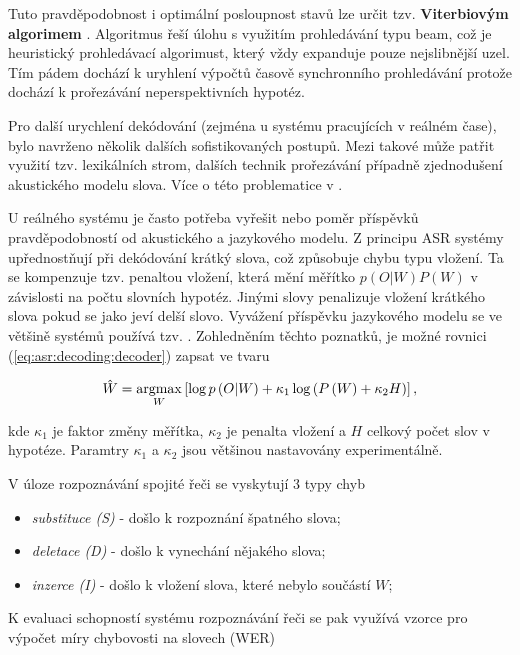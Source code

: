 \noindent Tuto pravděpodobnost i optimální posloupnost stavů lze určit tzv. \textbf{Viterbiovým algorimem} \cite{Holmes2001}. Algoritmus řeší úlohu s využitím prohledávání typu beam, což je heuristický prohledávací algorimust, který vždy expanduje pouze nejslibnější uzel. Tím pádem dochází k uryhlení výpočtů časově synchronního prohledávání protože dochází k prořezávání neperspektivních hypotéz.

Pro další urychlení dekódování (zejména u systému pracujících v reálném čase), bylo navrženo několik dalších sofistikovaných postupů. Mezi takové může patřit využití tzv. lexikálních strom, dalších technik prořezávání případně zjednodušení akustického modelu slova. Více o této problematice v \cite{Psutka2006}.

U reálného systému je často potřeba vyřešit nebo  poměr příspěvků pravděpodobností od akustického a jazykového modelu. Z principu ASR systémy upřednostňují při dekódování krátký slova, což způsobuje chybu typu vložení. Ta se kompenzuje tzv. penaltou vložení, která mění měřítko $p(O|W)P(W)$ v závislosti na počtu slovních hypotéz. Jinými slovy penalizuje vložení krátkého slova pokud se jako  jeví delší slovo. Vyvážení příspěvku jazykového modelu se ve většině systémů používá tzv. . Zohledněním těchto poznatků, je možné rovnici (\ref{eq:asr:decoding:decoder}) zapsat ve tvaru

\begin{equation}
  \hat{W} = \operatorname*{argmax}_{W} \left[\log p\left(O|W\right) + \kappa_1 \log\left(P\left(W\right) + \kappa_2H\right)\right],
  \label{eq:asr:decoding:compensated}
\end{equation}

\noindent kde $\kappa_1$ je faktor změny měřítka, $\kappa_2$ je penalta vložení a $H$ celkový počet slov v hypotéze. Paramtry $\kappa_1$ a $\kappa_2$ jsou většinou nastavovány experimentálně.

V úloze rozpoznávání spojité řeči se vyskytují 3 typy chyb

\begin{itemize}
  \item \textit{substituce (S)} - došlo k rozpoznání špatného slova;
  \item \textit{deletace (D)} - došlo k vynechání nějakého slova;
  \item \textit{inzerce (I)} - došlo k vložení slova, které nebylo součástí $W$;
\end{itemize}

\noindent K evaluaci schopností systému rozpoznávání řeči se pak využívá vzorce pro výpočet míry chybovosti na slovech (WER)

